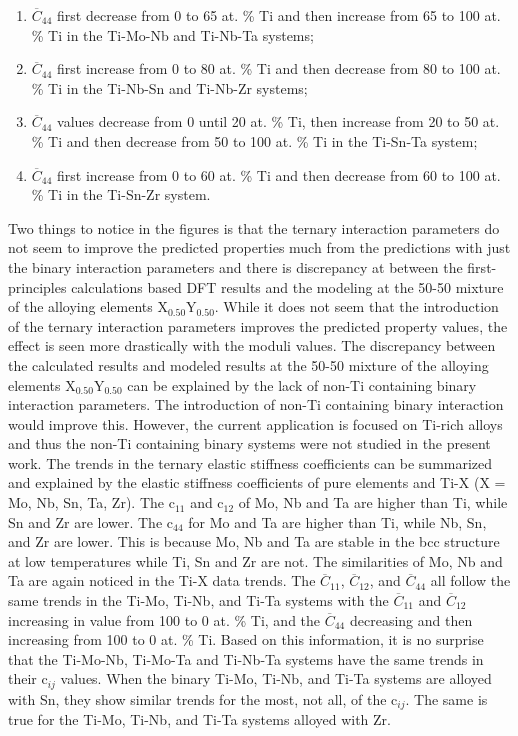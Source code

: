 \begin{enumerate}
\begin{enumerate}
		\item $\overline{C}_{44}$ first decrease from 0 to 65 at. \% Ti and then increase from 65 to 100 at. \% Ti in the Ti-Mo-Nb and Ti-Nb-Ta systems;
		\item $\overline{C}_{44}$ first increase from 0 to 80 at. \% Ti and then decrease from 80 to 100 at. \% Ti in the Ti-Nb-Sn and Ti-Nb-Zr systems;
		\item $\overline{C}_{44}$ values decrease from 0 until 20 at. \% Ti, then increase from 20 to 50 at. \% Ti and then decrease from 50 to 100 at. \% Ti in the Ti-Sn-Ta system;
		\item $\overline{C}_{44}$ first increase from 0 to 60 at. \% Ti and then decrease from 60 to 100 at. \% Ti in the Ti-Sn-Zr system.
	\end{enumerate}
\end{enumerate}

Two things to notice in the figures is that the ternary interaction parameters do not seem to improve the predicted properties much from the predictions with just the binary interaction parameters and there is discrepancy at between the first-principles calculations based DFT results and the modeling at the 50-50 mixture of the alloying elements X$_{0.50}$Y$_{0.50}$. While it does not seem that the introduction of the ternary interaction parameters improves the predicted property values, the effect is seen more drastically with the moduli values. The discrepancy between the calculated results and modeled results at the 50-50 mixture of the alloying elements X$_{0.50}$Y$_{0.50}$ can be explained by the lack of non-Ti containing binary interaction parameters. The introduction of non-Ti containing binary interaction would improve this. However, the current application is focused on Ti-rich alloys and thus the non-Ti containing binary systems were not studied in the present work. The trends in the ternary elastic stiffness coefficients can be summarized and explained by the elastic stiffness coefficients of pure elements and Ti-X (X = Mo, Nb, Sn, Ta, Zr). The c$_{11}$ and c$_{12}$ of Mo, Nb and Ta are higher than Ti, while Sn and Zr are lower. The c$_{44}$ for Mo and Ta are higher than Ti, while Nb, Sn, and Zr are lower. This is because Mo, Nb and Ta are stable in the bcc structure at low temperatures while Ti, Sn and Zr are not. The similarities of Mo, Nb and Ta are again noticed in the Ti-X data trends. The $\overline{C}_{11}$, $\overline{C}_{12}$, and $\overline{C}_{44}$ all follow the same trends in the Ti-Mo, Ti-Nb, and Ti-Ta systems with the $\overline{C}_{11}$ and $\overline{C}_{12}$ increasing in value from 100 to 0 at. \% Ti, and the $\overline{C}_{44}$ decreasing and then increasing from 100 to 0 at. \% Ti. Based on this information, it is no surprise that the Ti-Mo-Nb, Ti-Mo-Ta and Ti-Nb-Ta systems have the same trends in their c$_{ij}$ values. When the binary Ti-Mo, Ti-Nb, and Ti-Ta systems are alloyed with Sn, they show similar trends for the most, not all, of the c$_{ij}$. The same is true for the Ti-Mo, Ti-Nb, and Ti-Ta systems alloyed with Zr.

